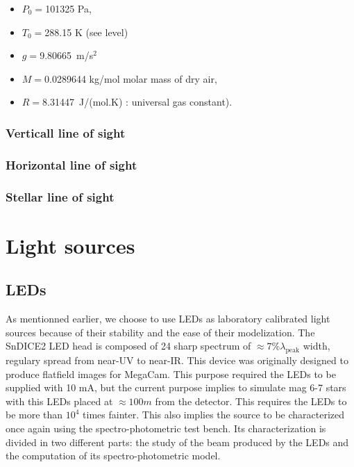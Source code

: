 \documentclass[\docopts]{\docclass}
\begin{document}
\begin{itemize}
\item $P_0= $101325 Pa,
\item $T_0=$288.15 K (see level)
\item  $g=$9.80665~m/s$^2$
\item  $M=$0.0289644 kg/mol molar mass of dry air,
\item  $R=$8.31447~J/(mol.K) : universal gas constant). 
\end{itemize}


\subsubsection{Verticall line of sight}
\label{sec:vline}


\subsubsection{Horizontal line of sight}
\label{sec:hline}


\subsubsection{Stellar line of sight}
\label{sec:av}


\section{Light sources}
\label{sec:sources}

\subsection{LEDs}
\label{sec:leds}
As mentionned earlier, we choose to use LEDs as laboratory calibrated
light sources because of their stability and the ease of their
modelization. The SnDICE2 LED head is composed of 24 sharp spectrum of
$\approx 7\% \lambda_\text{peak}$ width, regulary spread from near-UV to
near-IR. This device was originally designed to produce flatfield
images for MegaCam. This purpose required the LEDs to be supplied with
10 mA, but the current purpose implies to simulate mag 6-7 stars with
this LEDs placed at $\approx 100 m$ from the detector. This requires
the LEDs to be more than $10^4$ times fainter. This also implies the
source to be characterized once again using the spectro-photometric
test bench. Its characterization is divided in two different parts:
the study of the beam produced by the LEDs and the computation of its
spectro-photometric model.
\end{document}
